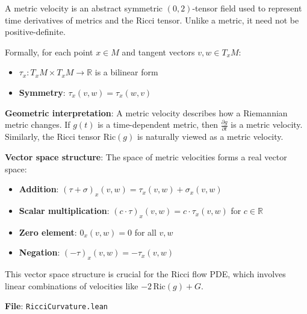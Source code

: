 \begin{definition}
\label{def:metric_velocity}
\leanok
{}
A metric velocity is an abstract symmetric $(0,2)$-tensor field used to represent time derivatives of metrics and the Ricci tensor. Unlike a metric, it need not be positive-definite.

Formally, for each point $x \in M$ and tangent vectors $v, w \in T_xM$:
\begin{itemize}
\item $\tau_x : T_xM \times T_xM \to \mathbb{R}$ is a bilinear form
\item \textbf{Symmetry}: $\tau_x(v, w) = \tau_x(w, v)$
\end{itemize}

\textbf{Geometric interpretation}: A metric velocity describes how a Riemannian metric changes. If $g(t)$ is a time-dependent metric, then $\frac{\partial g}{\partial t}$ is a metric velocity. Similarly, the Ricci tensor $\mathrm{Ric}(g)$ is naturally viewed as a metric velocity.

\textbf{Vector space structure}: The space of metric velocities forms a real vector space:
\begin{itemize}
\item \textbf{Addition}: $(\tau + \sigma)_x(v,w) = \tau_x(v,w) + \sigma_x(v,w)$
\item \textbf{Scalar multiplication}: $(c \cdot \tau)_x(v,w) = c \cdot \tau_x(v,w)$ for $c \in \mathbb{R}$
\item \textbf{Zero element}: $0_x(v,w) = 0$ for all $v,w$
\item \textbf{Negation}: $(-\tau)_x(v,w) = -\tau_x(v,w)$
\end{itemize}

This vector space structure is crucial for the Ricci flow PDE, which involves linear combinations of velocities like $-2\,\mathrm{Ric}(g) + G$.

\textbf{File}: \texttt{RicciCurvature.lean}
\end{definition}

